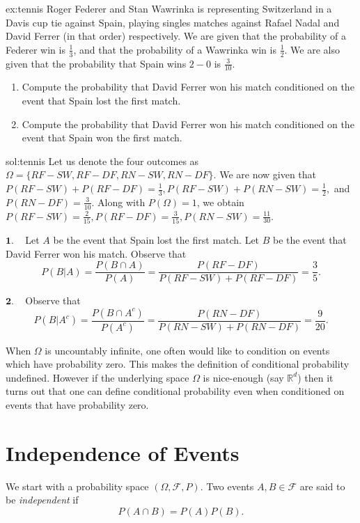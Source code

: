 \begin{excr}{ex:tennis}
Roger Federer and Stan Wawrinka is representing Switzerland in a Davis cup tie against Spain, playing singles matches against Rafael Nadal and David Ferrer (in that order)  respectively.
We are given that the probability of a Federer win is $\frac{1}{3}$, and that the probability of a Wawrinka win is $\frac{1}{2}$. We are also given that the probability that Spain wins $2-0$ is $\frac{3}{10}$.
\begin{enumerate}
\item Compute the probability that David Ferrer won his match conditioned on the event that Spain lost the first match.
\item Compute the probability that David Ferrer won his match conditioned on the event that Spain won the first match.
\end{enumerate}
\end{excr}
\begin{soln}{sol:tennis}
Let us denote the four outcomes as $\Omega=\{RF-SW,RF-DF,RN-SW,RN-DF\}$. We are now given that $P(RF-SW) + P(RF-DF)=\frac{1}{3}, P(RF-SW) + P(RN-SW) = \frac 12,$ and $P(RN-DF) =\frac{3}{10}$. Along with $P(\Omega)=1$, we obtain
$P(RF-SW)=\frac{2}{15}, P(RF-DF) = \frac{3}{15},  P(RN-SW) = \frac{11}{30}$.

$\mathbf{1}$. ~ Let $A$ be the event that Spain lost the first match. Let $B$ be the event that David Ferrer won his match. Observe that
$$ P(B|A) = \frac{P(B\cap A)}{P(A)}= \frac{P(RF-DF)}{P(RF-SW) + P(RF-DF)}=\frac{3}{5}.$$

$\mathbf{2}$. ~ Observe that
$$ P(B|A^c) = \frac{P(B\cap A^c)}{P(A^c)}= \frac{P(RN-DF)}{P(RN-SW) + P(RN-DF)}=\frac{9}{20}.$$
\end{soln}

\begin{remark}
When $\Omega$ is uncountably infinite, one often would like to condition on events which have probability zero. This makes the definition of conditional probability undefined. However if the underlying space $\Omega$ is nice-enough (say $\mathbb{R}^d$) then \adv it turns out that one can define conditional probability even when conditioned on events that have probability zero.
\end{remark}

\section{Independence of Events}
We start with a probability space $(\Omega, \mathcal F, P)$.
Two events $A,B \in \mathcal{F}$ are said to be \textit{independent} if
$$P(A \cap B) = P(A) P(B).$$

